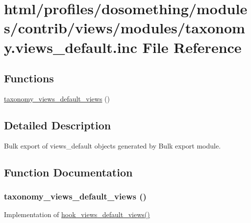 \hypertarget{taxonomy_8views__default_8inc}{
\section{html/profiles/dosomething/modules/contrib/views/modules/taxonomy.views\_\-default.inc File Reference}
\label{taxonomy_8views__default_8inc}
}
\subsection*{Functions}
\begin{DoxyCompactItemize}
\item 
\hyperlink{taxonomy_8views__default_8inc_add840bcb14060e4e184f0f4d6d2b4622}{taxonomy\_\-views\_\-default\_\-views} ()
\end{DoxyCompactItemize}


\subsection{Detailed Description}
Bulk export of views\_\-default objects generated by Bulk export module. 

\subsection{Function Documentation}
\hypertarget{taxonomy_8views__default_8inc_add840bcb14060e4e184f0f4d6d2b4622}{
\subsubsection[{taxonomy\_\-views\_\-default\_\-views}]{\setlength{\rightskip}{0pt plus 5cm}taxonomy\_\-views\_\-default\_\-views ()}}
\label{taxonomy_8views__default_8inc_add840bcb14060e4e184f0f4d6d2b4622}
Implementation of \hyperlink{group__views__hooks_ga23edb74860682fa88f75cf94b97c2e15}{hook\_\-views\_\-default\_\-views()} 